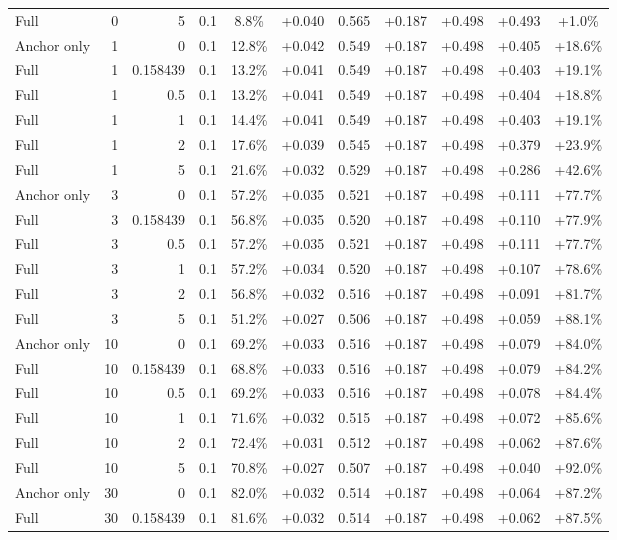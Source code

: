 \begin{table}[htbp]
\begin{tabular}{lrrrccccccc}
Full & 0 & 5 & 0.1 & 8.8\% & +0.040 & 0.565 & +0.187 & +0.498 & +0.493 & +1.0\% \\
Anchor only & 1 & 0 & 0.1 & 12.8\% & +0.042 & 0.549 & +0.187 & +0.498 & +0.405 & +18.6\% \\
Full & 1 & 0.158439 & 0.1 & 13.2\% & +0.041 & 0.549 & +0.187 & +0.498 & +0.403 & +19.1\% \\
Full & 1 & 0.5 & 0.1 & 13.2\% & +0.041 & 0.549 & +0.187 & +0.498 & +0.404 & +18.8\% \\
Full & 1 & 1 & 0.1 & 14.4\% & +0.041 & 0.549 & +0.187 & +0.498 & +0.403 & +19.1\% \\
Full & 1 & 2 & 0.1 & 17.6\% & +0.039 & 0.545 & +0.187 & +0.498 & +0.379 & +23.9\% \\
Full & 1 & 5 & 0.1 & 21.6\% & +0.032 & 0.529 & +0.187 & +0.498 & +0.286 & +42.6\% \\
Anchor only & 3 & 0 & 0.1 & 57.2\% & +0.035 & 0.521 & +0.187 & +0.498 & +0.111 & +77.7\% \\
Full & 3 & 0.158439 & 0.1 & 56.8\% & +0.035 & 0.520 & +0.187 & +0.498 & +0.110 & +77.9\% \\
Full & 3 & 0.5 & 0.1 & 57.2\% & +0.035 & 0.521 & +0.187 & +0.498 & +0.111 & +77.7\% \\
Full & 3 & 1 & 0.1 & 57.2\% & +0.034 & 0.520 & +0.187 & +0.498 & +0.107 & +78.6\% \\
Full & 3 & 2 & 0.1 & 56.8\% & +0.032 & 0.516 & +0.187 & +0.498 & +0.091 & +81.7\% \\
Full & 3 & 5 & 0.1 & 51.2\% & +0.027 & 0.506 & +0.187 & +0.498 & +0.059 & +88.1\% \\
Anchor only & 10 & 0 & 0.1 & 69.2\% & +0.033 & 0.516 & +0.187 & +0.498 & +0.079 & +84.0\% \\
Full & 10 & 0.158439 & 0.1 & 68.8\% & +0.033 & 0.516 & +0.187 & +0.498 & +0.079 & +84.2\% \\
Full & 10 & 0.5 & 0.1 & 69.2\% & +0.033 & 0.516 & +0.187 & +0.498 & +0.078 & +84.4\% \\
Full & 10 & 1 & 0.1 & 71.6\% & +0.032 & 0.515 & +0.187 & +0.498 & +0.072 & +85.6\% \\
Full & 10 & 2 & 0.1 & 72.4\% & +0.031 & 0.512 & +0.187 & +0.498 & +0.062 & +87.6\% \\
Full & 10 & 5 & 0.1 & 70.8\% & +0.027 & 0.507 & +0.187 & +0.498 & +0.040 & +92.0\% \\
Anchor only & 30 & 0 & 0.1 & 82.0\% & +0.032 & 0.514 & +0.187 & +0.498 & +0.064 & +87.2\% \\
Full & 30 & 0.158439 & 0.1 & 81.6\% & +0.032 & 0.514 & +0.187 & +0.498 & +0.062 & +87.5\% \\

\end{tabular}
\end{table}

